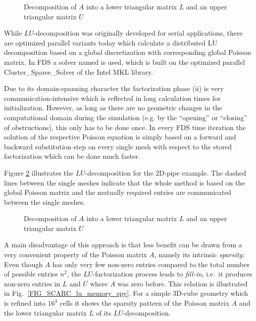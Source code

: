 \begin{figure}[ht]
\begin{center}

\end{center}
\caption{Decomposition of $A$ into a lower triangular matrix $L$ and an upper triangular matrix $U$}
\label{FIG_SCARC_lu_decomposition}
\end{figure}


While $LU$-decomposition was originally developed for serial applications, there are optimized parallel variants today which calculate a distributed LU decomposition based on a global discretization with corresponding global Poisson matrix. In FDS a solver named \uglmat{} is used, which is built on the optimized parallel {\ct Cluster\_Sparse\_Solver} of the Intel\textsuperscript{\textregistered} MKL library.

Due to its domain-spanning character the factorization phase (ii) is very communication-intensive which is reflected in long calculation times for initialization.
However, as long as there are no geometric changes in the computational domain during the simulation (e.g. by the ``opening'' or ``closing'' of obstructions), this only has to be done once.
In every FDS time iteration the solution of the respective Poisson equation is simply based on a forward and backward substitution step on every single mesh with respect to the stored factorization which can be done much faster.

\newpage
Figure \ref{FIG_SCARC_uglmat} illustrates the $LU$-decomposition for the 2D-pipe example. The dashed lines between the single meshes indicate that the whole method is based on the global Poisson matrix and the mutually required entries are communicated between the single meshes.

\begin{figure}[ht]
\centering
\caption{Decomposition of $A$ into a lower triangular matrix $L$ and an upper triangular matrix $U$}
\label{FIG_SCARC_uglmat}
\end{figure}

A main disadvantage of this approach is that less benefit can be drawn from a very convenient property of 
the Poisson matrix $A$, namely its intrinsic {\it sparsity}:
Even though $A$ has only very few non-zero entries compared to the total number of possible entries $n^2$, 
the $LU$-factorization process leads to {\it fill-in}, i.e.\ it produces non-zero entries in $L$ and $U$ where $A$ was zero before.
This relation is illustrated in Fig.~\ref{FIG_SCARC_lu_memory_spy}.
For a simple 3D-cube geometry which is refined into $16^3$ cells it shows the sparsity pattern of the Poisson matrix $A$
and the lower triangular matrix $L$ of its $LU$-decomposition.

